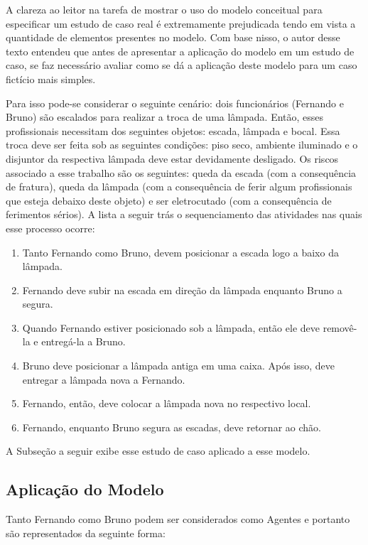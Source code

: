 A clareza ao leitor na tarefa de mostrar o uso do modelo conceitual para especificar um estudo de caso real é extremamente prejudicada tendo em vista a quantidade de elementos presentes no modelo. Com base nisso, o autor desse texto entendeu que antes de apresentar a aplicação do modelo em um estudo de caso, se faz necessário avaliar como se dá a aplicação deste modelo para um caso fictício mais simples. 

Para isso pode-se considerar o seguinte cenário: dois funcionários (Fernando e Bruno) são escalados para realizar a troca de uma lâmpada. Então, esses profissionais necessitam dos seguintes objetos: escada, lâmpada e bocal. Essa troca deve ser feita sob as seguintes condições: piso seco, ambiente iluminado e o disjuntor da respectiva lâmpada deve estar devidamente desligado. Os riscos associado a esse trabalho são os seguintes: queda da escada (com a consequência de fratura), queda da lâmpada (com a consequência de ferir algum profissionais que esteja debaixo deste objeto) e ser eletrocutado (com a consequência de ferimentos sérios). A lista a seguir trás o sequenciamento das atividades nas quais esse processo ocorre:

\begin{enumerate}
	\item Tanto Fernando como Bruno, devem posicionar a escada logo a baixo da lâmpada. 
	\item Fernando deve subir na escada em direção da lâmpada enquanto Bruno a segura. 
	\item Quando Fernando estiver posicionado sob a lâmpada, então ele deve removê-la e entregá-la a Bruno. 
	\item Bruno deve posicionar a lâmpada antiga em uma caixa. Após isso, deve entregar a lâmpada nova a Fernando.
	\item Fernando, então, deve colocar a lâmpada nova no respectivo local. 
	\item Fernando, enquanto Bruno segura as escadas, deve retornar ao chão. 
\end{enumerate}

A Subseção a seguir exibe esse estudo de caso aplicado a esse modelo. 

\subsection{Aplicação do Modelo}

Tanto Fernando como Bruno podem ser considerados como Agentes e portanto são representados da seguinte forma:

